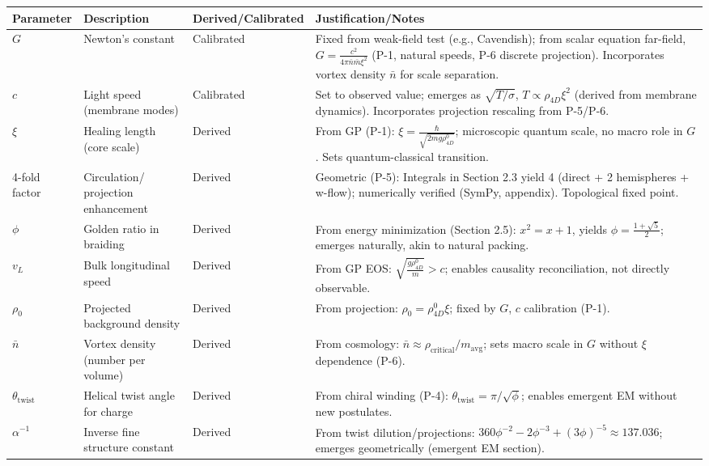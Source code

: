 \begin{table}[H]
\centering
\small
\begin{tabularx}{\linewidth}{|p{1.5cm}|p{2cm}|l|Y|}
\hline
Parameter & Description & Derived/Calibrated & Justification/Notes \\
\hline
$G$ & Newton's constant & Calibrated & Fixed from weak-field test (e.g., Cavendish); from scalar equation far-field, $G = \frac{c^2}{4\pi \bar{n} \bar{m} \xi^2}$ (P-1, natural speeds, P-6 discrete projection). Incorporates vortex density $\bar{n}$ for scale separation. \\
\hline
$c$ & Light speed (membrane modes) & Calibrated & Set to observed value; emerges as $\sqrt{T / \sigma}$, $T \propto \rho_{4D} \xi^2$ (derived from membrane dynamics). Incorporates projection rescaling from P-5/P-6. \\
\hline
$\xi$ & Healing length (core scale) & Derived & From GP (P-1): $\xi = \frac{\hbar}{\sqrt{2 m g \rho_{4D}^0}}$; microscopic quantum scale, no macro role in $G$. Sets quantum-classical transition. \\
-fold factor & Circulation/ projection enhancement & Derived & Geometric (P-5): Integrals in Section 2.3 yield 4 (direct + 2 hemispheres + w-flow); numerically verified (SymPy, appendix). Topological fixed point. \\
\hline
$\phi$ & Golden ratio in braiding & Derived & From energy minimization (Section 2.5): $x^2 = x + 1$, yields $\phi = \frac{1 + \sqrt{5}}{2}$; emerges naturally, akin to natural packing. \\
\hline
$v_L$ & Bulk longitudinal speed & Derived & From GP EOS: $\sqrt{\frac{g \rho_{4D}^0}{m}} > c$; enables causality reconciliation, not directly observable. \\
\hline
$\rho_0$ & Projected background density & Derived & From projection: $\rho_0 = \rho_{4D}^0 \xi$; fixed by $G$, $c$ calibration (P-1). \\
\hline
$\bar{n}$ & Vortex density (number per volume) & Derived & From cosmology: $\bar{n} \approx \rho_{\text{critical}} / m_{\text{avg}}$; sets macro scale in $G$ without $\xi$ dependence (P-6). \\
\hline
$\theta_{\text{twist}}$ & Helical twist angle for charge & Derived & From chiral winding (P-4): $\theta_{\text{twist}} = \pi / \sqrt{\phi}$; enables emergent EM without new postulates. \\
\hline
$\alpha^{-1}$ & Inverse fine structure constant & Derived & From twist dilution/projections: $360 \phi^{-2} - 2 \phi^{-3} + (3 \phi)^{-5} \approx 137.036$; emerges geometrically (emergent EM section). \\

\end{tabularx}
\end{table}
